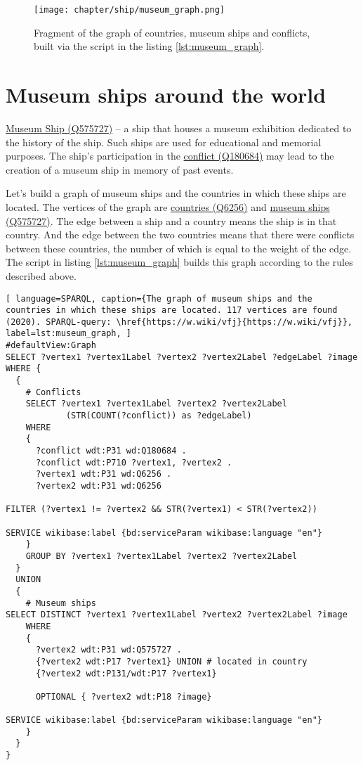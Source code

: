 \begin{figure*}[ht]
  \texttt{[image: chapter/ship/museum\_graph.png]}
  \caption[Graph of countries and museum ships]{Fragment of the graph of countries, museum ships and conflicts, built via the script in the listing \ref{lst:museum_graph}.}%
  \label{fig:museum_graph}%
\end{figure*}
\section{Museum ships around the world}
\href{https://www.wikidata.org/wiki/Q575727}{Museum Ship (Q575727)} -- a ship that houses a museum exhibition dedicated to the history of the ship. Such ships are used for educational and memorial purposes. The ship's participation in the \href{https://www.wikidata.org/wiki/Q180684}{conflict (Q180684)} may lead to the creation of a museum ship in memory of past events.

Let's build a graph of museum ships and the countries in which these ships are located. The vertices of the graph are \href{https://www.wikidata.org/wiki/Q6256}{countries (Q6256)} and \href{https://www.wikidata.org/wiki/Q575727}{museum ships (Q575727)}. The edge between a ship and a country means the ship is in that country. And the edge between the two countries means that there were conflicts between these countries, the number of which is equal to the weight of the edge. The script in listing \ref{lst:museum_graph} builds this graph according to the rules described above.

\begin{lstlisting}[ language=SPARQL, caption={The graph of museum ships and the countries in which these ships are located. 117 vertices are found (2020). SPARQL-query: \href{https://w.wiki/vfj}{https://w.wiki/vfj}}, label=lst:museum_graph, ]
#defaultView:Graph    
SELECT ?vertex1 ?vertex1Label ?vertex2 ?vertex2Label ?edgeLabel ?image 
WHERE {
  {
    # Conflicts
    SELECT ?vertex1 ?vertex1Label ?vertex2 ?vertex2Label 
            (STR(COUNT(?conflict)) as ?edgeLabel) 
    WHERE
    {
      ?conflict wdt:P31 wd:Q180684 .
      ?conflict wdt:P710 ?vertex1, ?vertex2 .
      ?vertex1 wdt:P31 wd:Q6256 . 
      ?vertex2 wdt:P31 wd:Q6256
  
FILTER (?vertex1 != ?vertex2 && STR(?vertex1) < STR(?vertex2))
    
SERVICE wikibase:label {bd:serviceParam wikibase:language "en"}
    }
    GROUP BY ?vertex1 ?vertex1Label ?vertex2 ?vertex2Label
  }
  UNION
  {
    # Museum ships
SELECT DISTINCT ?vertex1 ?vertex1Label ?vertex2 ?vertex2Label ?image
    WHERE
    {
      ?vertex2 wdt:P31 wd:Q575727 .
      {?vertex2 wdt:P17 ?vertex1} UNION # located in country
      {?vertex2 wdt:P131/wdt:P17 ?vertex1}
          
      OPTIONAL { ?vertex2 wdt:P18 ?image}
          
SERVICE wikibase:label {bd:serviceParam wikibase:language "en"}
    }
  }
}
\end{lstlisting}

